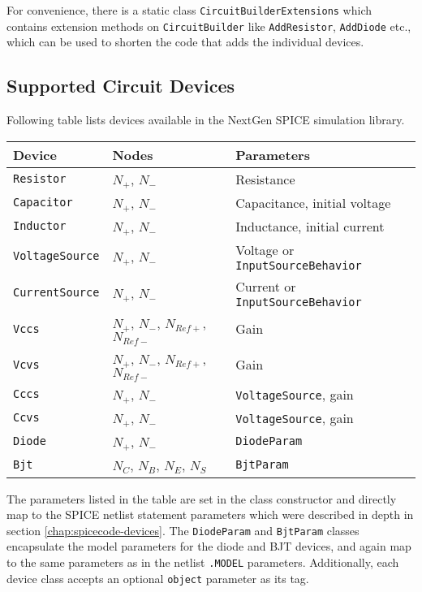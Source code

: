 For convenience, there is a static class \texttt{CircuitBuilderExtensions} which contains extension methods on \texttt{CircuitBuilder} like \texttt{AddResistor}, \texttt{AddDiode} etc., which can be used to shorten the code that adds the individual devices.

\subsection{Supported Circuit Devices}
\label{chap:devdocs:devices}
Following table lists devices available in the NextGen SPICE simulation library. 

\begin{center}
	\begin{tabular}{|l|l|l|}
		\hline
		Device & Nodes & Parameters \\ \hline \hline
		\texttt{Resistor} & $N_+$, $N_-$ & Resistance \\ \hline
		\texttt{Capacitor} & $N_+$, $N_-$ & Capacitance, initial voltage \\ \hline
		\texttt{Inductor} & $N_+$, $N_-$ & Inductance, initial current \\ \hline
		\texttt{VoltageSource} & $N_+$, $N_-$ & Voltage or \texttt{InputSourceBehavior} \\ \hline
		\texttt{CurrentSource} & $N_+$, $N_-$ & Current or \texttt{InputSourceBehavior} \\ \hline
		\texttt{Vccs} & $N_+$, $N_-$, $N_{Ref+}$, $N_{Ref-}$ & Gain \\ \hline
		\texttt{Vcvs} & $N_+$, $N_-$, $N_{Ref+}$, $N_{Ref-}$ & Gain \\ \hline
		\texttt{Cccs} & $N_+$, $N_-$ & \texttt{VoltageSource}, gain \\ \hline
		\texttt{Ccvs} & $N_+$, $N_-$ & \texttt{VoltageSource}, gain \\ \hline
		\texttt{Diode} & $N_+$, $N_-$ & \texttt{DiodeParam} \\ \hline
		\texttt{Bjt} & $N_{C}$, $N_{B}$, $N_{E}$, $N_{S}$ & \texttt{BjtParam} \\ \hline
	\end{tabular}
\end{center}

The parameters listed in the table are set in the class constructor and directly map to the SPICE netlist statement parameters which were described in depth in section \ref{chap:spicecode-devices}. The \texttt{DiodeParam} and \texttt{BjtParam} classes encapsulate the model parameters for the diode and BJT devices, and again map to the same parameters as in the netlist \texttt{.MODEL} parameters. Additionally, each device class accepts an optional \texttt{object} parameter as its tag.

